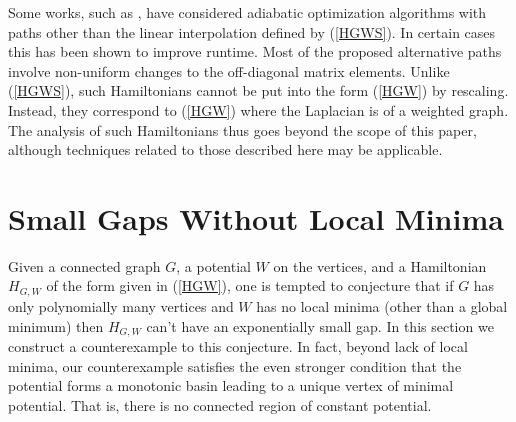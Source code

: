 Some works, such as \cite{diffinit, diffmid1, diffmid2}, have
considered adiabatic optimization algorithms with paths other than the
linear interpolation defined by (\ref{HGWS}). In certain cases this
has been shown to improve runtime. Most of the proposed alternative
paths involve non-uniform changes to the off-diagonal matrix
elements. Unlike (\ref{HGWS}), such Hamiltonians cannot be put into
the form (\ref{HGW}) by rescaling. Instead, they correspond to
(\ref{HGW}) where the Laplacian is of a weighted graph. The analysis
of such Hamiltonians thus goes beyond the scope of this paper,
although techniques related to those described here may be
applicable.

\section{Small Gaps Without Local Minima}
\label{counter}

Given a connected graph $G$, a potential $W$ on the vertices, and a
Hamiltonian $H_{G,W}$ of the form given in (\ref{HGW}), one is tempted to
conjecture that if $G$ has only polynomially many vertices and $W$ has
no local minima (other than a global minimum) then $H_{G,W}$ can't
have an exponentially small gap. In this section we construct a
counterexample to this conjecture. In fact, beyond lack of local
minima, our counterexample satisfies the even stronger condition that
the potential forms a monotonic basin leading to a unique vertex of
minimal potential. That is, there is no connected region of constant
potential.

